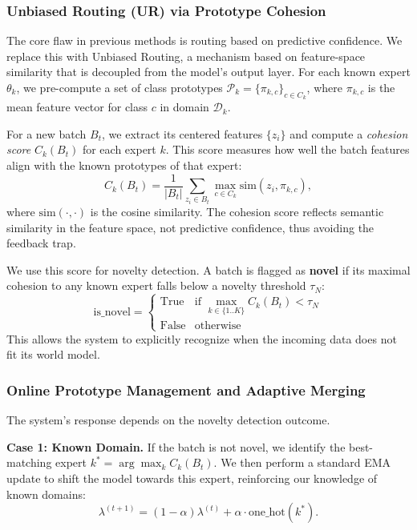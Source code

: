 \documentclass[twoside]{article}
\begin{document}
\subsubsection{Unbiased Routing (UR) via Prototype Cohesion}

The core flaw in previous methods is routing based on predictive confidence. We replace this with Unbiased Routing, a mechanism based on feature-space similarity that is decoupled from the model's output layer. For each known expert $\theta_k$, we pre-compute a set of class prototypes $\mathcal{P}_k = \{\pi_{k,c}\}_{c \in C_k}$, where $\pi_{k,c}$ is the mean feature vector for class $c$ in domain $\mathcal{D}_k$.

For a new batch $B_t$, we extract its centered features $\{z_i\}$ and compute a \textit{cohesion score} $C_k(B_t)$ for each expert $k$. This score measures how well the batch features align with the known prototypes of that expert:
\begin{equation}
C_k(B_t) = \frac{1}{|B_t|} \sum_{z_i \in B_t} \max_{c \in C_k} \text{sim}(z_i, \pi_{k,c}),
\label{eq:cohesion}
\end{equation}
where $\text{sim}(\cdot, \cdot)$ is the cosine similarity. The cohesion score reflects semantic similarity in the feature space, not predictive confidence, thus avoiding the feedback trap.

We use this score for novelty detection. A batch is flagged as \textbf{novel} if its maximal cohesion to any known expert falls below a novelty threshold $\tau_N$:
\begin{equation}
\text{is\_novel} = \begin{cases} \text{True} & \text{if } \max_{k \in \{1..K\}} C_k(B_t) < \tau_N \\ \text{False} & \text{otherwise} \end{cases}
\label{eq:novelty_detection}
\end{equation}
This allows the system to explicitly recognize when the incoming data does not fit its world model.

\subsubsection{Online Prototype Management and Adaptive Merging}

The system's response depends on the novelty detection outcome.

\textbf{Case 1: Known Domain.} If the batch is not novel, we identify the best-matching expert $k^* = \arg\max_k C_k(B_t)$. We then perform a standard EMA update to shift the model towards this expert, reinforcing our knowledge of known domains:
\begin{equation}
\lambda^{(t+1)} = (1-\alpha) \lambda^{(t)} + \alpha \cdot \text{one\_hot}(k^*).
\end{equation}
\end{document}
